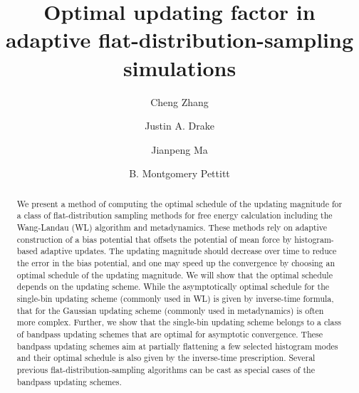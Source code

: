 \documentclass[reprint, superscriptaddress, floatfix]{revtex4-1}
\begin{document}
\title{Optimal updating factor in adaptive flat-distribution-sampling simulations}

\author{Cheng Zhang}
\author{Justin A. Drake}
\author{Jianpeng Ma}
\author{B. Montgomery Pettitt}



\begin{abstract}
  We present a method of computing the optimal schedule
  of the updating magnitude
  for a class of flat-distribution sampling methods
  for free energy calculation including
  the Wang-Landau (WL) algorithm and metadynamics.
  These methods rely on adaptive construction of
  a bias potential that offsets
  the potential of mean force by histogram-based adaptive updates.
  The updating magnitude should decrease over time
  to reduce the error in the bias potential,
  and one may speed up the convergence by choosing an optimal schedule
  of the updating magnitude.
  We will show that
  the optimal schedule depends on the updating scheme.
  While the asymptotically optimal schedule for
  the single-bin updating scheme (commonly used in WL)
  is given by inverse-time formula,
  that for the Gaussian updating scheme (commonly used in metadynamics)
  is often more complex.
  Further,
  we show that the single-bin updating scheme
  belongs to a class of bandpass updating schemes
  that are optimal for asymptotic convergence.
  These bandpass updating schemes aim at
  partially flattening a few selected histogram modes
  and their optimal schedule
  is also given by the inverse-time prescription.
  Several previous flat-distribution-sampling algorithms
  can be cast as special cases of the bandpass updating schemes. 
\end{abstract}
\end{document}
